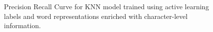 \begin{figure}
\begin{minipage}[b]{.4\textwidth}
\caption{Precision Recall Curve for KNN model trained using active learning labels and word representations enriched with character-level information.}\label{fig:al1_prcs_fasttext}
\end{minipage}
\end{figure}












